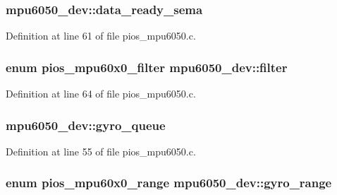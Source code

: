 \hypertarget{structmpu6050__dev_ad4d0a233a1d6f73d37c88f646dd36e3f}{
\subsubsection[{data\-\_\-ready\-\_\-sema}]{ mpu6050\-\_\-dev\-::data\-\_\-ready\-\_\-sema}}\label{structmpu6050__dev_ad4d0a233a1d6f73d37c88f646dd36e3f}


Definition at line 61 of file pios\-\_\-mpu6050.\-c.

\hypertarget{structmpu6050__dev_ac959727d047bc26d53673d376f76f8bc}{
\subsubsection[{filter}]{\setlength{\rightskip}{0pt plus 5cm}enum {\bf pios\-\_\-mpu60x0\-\_\-filter} mpu6050\-\_\-dev\-::filter}}\label{structmpu6050__dev_ac959727d047bc26d53673d376f76f8bc}


Definition at line 64 of file pios\-\_\-mpu6050.\-c.

\hypertarget{structmpu6050__dev_a91859d6141bf6c0d8dc50d144339baab}{
\subsubsection[{gyro\-\_\-queue}]{ mpu6050\-\_\-dev\-::gyro\-\_\-queue}}\label{structmpu6050__dev_a91859d6141bf6c0d8dc50d144339baab}


Definition at line 55 of file pios\-\_\-mpu6050.\-c.

\hypertarget{structmpu6050__dev_aaf65682756b6135dbeb042934660076a}{
\subsubsection[{gyro\-\_\-range}]{\setlength{\rightskip}{0pt plus 5cm}enum {\bf pios\-\_\-mpu60x0\-\_\-range} mpu6050\-\_\-dev\-::gyro\-\_\-range}}\label{structmpu6050__dev_aaf65682756b6135dbeb042934660076a}


